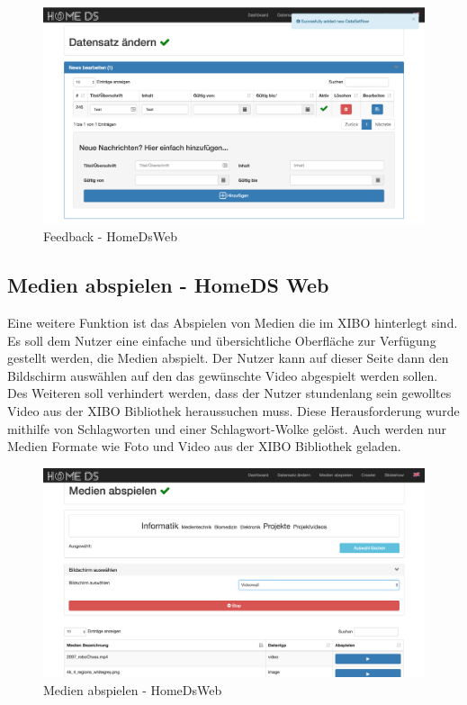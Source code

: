 \begin{figure}[H]
\centering
\includegraphics[width=1\textwidth]{images/08_HomeDsWeb/Message.png}
\caption{Feedback - HomeDsWeb}
\label{img:feedback}
\end{figure}

\subsection{Medien abspielen - HomeDS Web}\label{sec:playmedia}
Eine weitere Funktion ist das Abspielen von Medien die im XIBO hinterlegt sind. Es soll dem Nutzer eine einfache und übersichtliche Oberfläche zur Verfügung gestellt werden, die Medien abspielt. Der Nutzer kann auf dieser Seite dann den Bildschirm auswählen auf den das gewünschte Video abgespielt werden sollen. Des Weiteren soll verhindert werden, dass der Nutzer stundenlang sein gewolltes Video aus der XIBO Bibliothek heraussuchen muss. Diese Herausforderung wurde mithilfe von Schlagworten und einer Schlagwort-Wolke gelöst. Auch werden nur Medien Formate wie Foto und Video aus der XIBO Bibliothek geladen.

\begin{figure}[H]
\centering
\includegraphics[width=1\textwidth]{images/08_HomeDsWeb/PlayMediaOverview.png}
\caption{Medien abspielen - HomeDsWeb}
\label{img:playmedia}
\end{figure}

